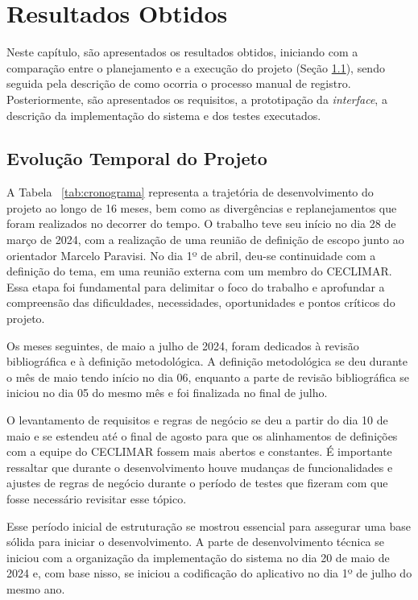 \chapter{Resultados Obtidos}
\label{cap:resultados_obtidos}

Neste capítulo, são apresentados os resultados obtidos, iniciando com a comparação entre o planejamento e a execução do projeto (Seção \ref{cronograma}), sendo seguida pela descrição de como ocorria o processo manual de registro. Posteriormente, são apresentados os requisitos, a prototipação da \textit{interface}, a descrição da implementação do sistema e dos testes executados.

\section{Evolução Temporal do Projeto}\label{cronograma}

A Tabela ~\ref{tab:cronograma} representa a trajetória de 
desenvolvimento do projeto ao longo de 16 meses, bem como as divergências e replanejamentos que foram realizados no decorrer do tempo. O trabalho teve seu início no dia 28 de março de 2024, com a realização de uma reunião de definição de escopo junto ao orientador Marcelo Paravisi. No dia 1º de abril, deu-se continuidade com a definição do tema, em uma reunião externa com um membro do CECLIMAR. Essa etapa foi fundamental para delimitar o foco do trabalho e aprofundar a compreensão das dificuldades, necessidades, oportunidades e pontos críticos do projeto.

Os meses seguintes, de maio a julho de 2024, foram dedicados à revisão bibliográfica e à definição metodológica. A definição metodológica se deu durante o mês de maio tendo início no dia 06, enquanto a parte de revisão bibliográfica se iniciou no dia 05 do mesmo mês e foi finalizada no final de julho. 

O levantamento de requisitos e regras de negócio se deu a partir do dia 10 de maio e se estendeu até o final de agosto para que os alinhamentos de definições com a equipe do CECLIMAR fossem mais abertos e constantes. É importante ressaltar que durante o desenvolvimento houve mudanças de funcionalidades e ajustes de regras de negócio durante o período de testes que fizeram com que fosse necessário revisitar esse tópico. 

Esse período inicial de estruturação se mostrou essencial para assegurar uma base sólida para iniciar o desenvolvimento. A parte de desenvolvimento técnica se iniciou com a organização da implementação do sistema no dia 20 de maio de 2024 e, com base nisso, se iniciou a codificação do aplicativo no dia 1º de julho do mesmo ano. 

